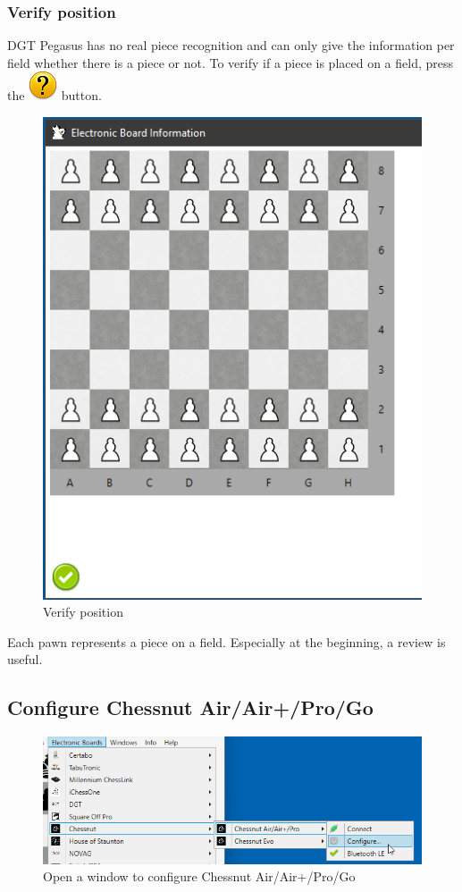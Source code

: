 \documentclass[11pt,a4paper]{article}
\begin{document}
\subsubsection{Verify position} \label{VerifyPegasusPosition}
DGT Pegasus has no real piece recognition and can only give the information per field whether there is a piece or not. To verify if a piece is placed on a field, press the  \includegraphics[scale=0.4]{emotion_question.png} button.

\begin{figure}[H]
	\centering
	\includegraphics[scale=0.8]{Pegasus5.png}
	\caption{Verify position}
	\label{fig:Pegasus5}
\end{figure}

Each pawn represents a piece on a field. Especially at the beginning, a review is useful. 

\subsection{Configure Chessnut Air/Air+/Pro/Go} \label{ConfigureChessnutAir}
\begin{figure}[H]
	\centering
	\includegraphics[scale=0.7]{ChessnutAir5.png}
	\caption{Open a window to configure Chessnut Air/Air+/Pro/Go}
	\label{fig:ChessnutAir5}
\end{figure}
\end{document}
